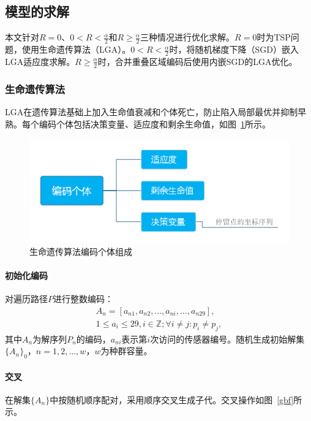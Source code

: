 \documentclass{whutmod}
\begin{document}
        \subsection{模型的求解}
            本文针对$R=0$、$0<R<\frac{\alpha}{2}$和$R \geqslant \frac{\alpha}{2}$三种情况进行优化求解。$R=0$时为TSP问题，使用生命遗传算法（LGA）。$0<R<\frac{\alpha}{2}$时，将随机梯度下降（SGD）嵌入LGA适应度求解。$R \geqslant \frac{\alpha}{2}$时，合并重叠区域编码后使用内嵌SGD的LGA优化。

            \subsubsection{生命遗传算法}
                LGA在遗传算法基础上加入生命值衰减和个体死亡，防止陷入局部最优并抑制早熟。每个编码个体包括决策变量、适应度和剩余生命值，如图~\ref{saf}所示。

                \begin{figure}[H]
                    \centering
                    \includegraphics[width=.8\textwidth]{figures/lga.png}
                    \caption{生命遗传算法编码个体组成}\label{saf}
                \end{figure}

                \paragraph{初始化编码}
                    对遍历路径$P$进行整数编码：
                    \begin{gather*}
                        A_n = [a_{n1}, a_{n2}, \dots, a_{ni}, \dots, a_{n29}], \\
                        1 \leqslant a_i \leqslant 29, i \in \mathbb{Z}; \forall i \neq j: p_i \neq p_j,
                    \end{gather*}
                    其中$A_n$为解序列$P_n$的编码，$a_{ni}$表示第$i$次访问的传感器编号。随机生成初始解集$\{A_n\}_0$，$n=1,2,\dots,w$，$w$为种群容量。

                \paragraph{交叉}
                    在解集$\{A_n\}$中按随机顺序配对，采用顺序交叉生成子代。交叉操作如图~\ref{gbf}所示。
\end{document}
